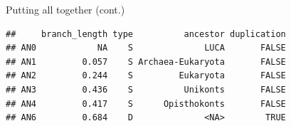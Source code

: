 \documentclass[9pt,ignorenonframetext,]{beamer}
\newenvironment{Shaded}{\begin{snugshade}}{\end{snugshade}}
\newcommand{\KeywordTok}[1]{\textcolor[rgb]{0.94,0.87,0.69}{#1}}
\newcommand{\CommentTok}[1]{\textcolor[rgb]{0.50,0.62,0.50}{#1}}
\newcommand{\OperatorTok}[1]{\textcolor[rgb]{0.94,0.94,0.82}{#1}}
\newcommand{\NormalTok}[1]{\textcolor[rgb]{0.80,0.80,0.80}{#1}}
\begin{document}
\begin{frame}[fragile]{Putting all together (cont.)}

\footnotesize

\begin{Shaded}
\end{Shaded}

\begin{verbatim}
##     branch_length type          ancestor duplication
## AN0            NA    S              LUCA       FALSE
## AN1         0.057    S Archaea-Eukaryota       FALSE
## AN2         0.244    S         Eukaryota       FALSE
## AN3         0.436    S          Unikonts       FALSE
## AN4         0.417    S      Opisthokonts       FALSE
## AN6         0.684    D              <NA>        TRUE
\end{verbatim}

\normalsize

\end{frame}
\end{document}

